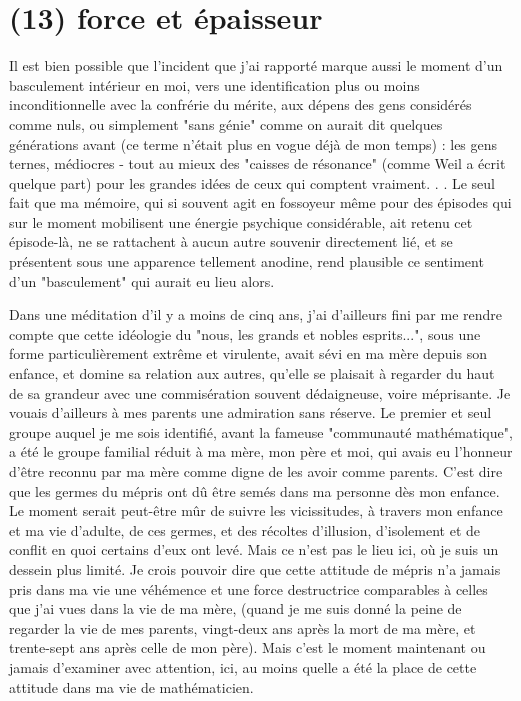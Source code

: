 \section{(13) force et épaisseur}

Il est bien possible que l'incident que j'ai rapporté marque aussi le moment d'un basculement intérieur en moi, vers une identification plus ou moins inconditionnelle avec la confrérie du mérite, aux dépens des gens considérés comme nuls, ou simplement "sans génie" comme on aurait dit quelques générations avant (ce terme n'était plus en vogue déjà de mon temps) : les gens ternes, médiocres - tout au mieux des "caisses de résonance" (comme Weil a écrit quelque part) pour les grandes idées de ceux qui comptent vraiment. . . Le seul fait que ma mémoire, qui si souvent agit en fossoyeur même pour des épisodes qui sur le moment mobilisent une énergie psychique considérable, ait retenu cet épisode-là, ne se rattachent à aucun autre souvenir directement lié, et se présentent sous une apparence tellement anodine, rend plausible ce sentiment d'un "basculement" qui aurait eu lieu alors.

Dans une méditation d'il y a moins de cinq ans, j'ai d'ailleurs fini par me rendre compte que cette idéologie du "nous, les grands et nobles esprits...", sous une forme particulièrement extrême et virulente, avait sévi en ma mère depuis son enfance, et domine sa relation aux autres, qu'elle se plaisait à regarder du haut de sa grandeur avec une commisération souvent dédaigneuse, voire méprisante. Je vouais d'ailleurs à mes parents une admiration sans réserve. Le premier et seul groupe auquel je me sois identifié, avant la fameuse "communauté mathématique", a été le groupe familial réduit à ma mère, mon père et moi, qui avais eu l'honneur d'être reconnu par ma mère comme digne de les avoir comme parents. C'est dire que les germes du mépris ont dû être semés dans ma personne dès mon enfance. Le moment serait peut-être mûr de suivre les vicissitudes, à travers mon enfance et ma vie d'adulte, de ces germes, et des récoltes d'illusion, d'isolement et de conflit en quoi certains d'eux ont levé. Mais ce n'est pas le lieu ici, où je suis un dessein plus limité. Je crois pouvoir dire que cette attitude de mépris n'a jamais pris dans ma vie une véhémence et une force destructrice comparables à celles que j'ai vues dans la vie de ma mère, (quand je me suis donné la peine de regarder la vie de mes parents, vingt-deux ans après la mort de ma mère, et trente-sept ans après celle de mon père). Mais c'est le moment maintenant ou jamais d'examiner avec attention, ici, au moins quelle a été la place de cette attitude dans ma vie de mathématicien.

